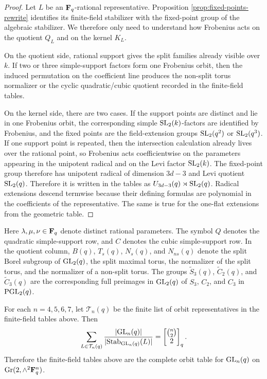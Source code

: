 \begin{proof}
Let \(L\) be an \(\mathbf F_q\)-rational representative. Proposition
\ref{prop:fixed-points-rewrite} identifies its finite-field stabilizer with the
fixed-point group of the algebraic stabilizer. We therefore only need to
understand how Frobenius acts on the quotient \(Q_L\) and on the kernel \(K_L\).

On the quotient side, rational support gives the split families already visible
over \(k\). If two or three simple-support factors form one Frobenius orbit,
then the induced permutation on the coefficient line produces the non-split
torus normalizer or the cyclic quadratic/cubic quotient recorded in the
finite-field tables.

On the kernel side, there are two cases. If the support points are distinct and
lie in one Frobenius orbit, the corresponding simple \(\mathrm{SL}_2(k)\)-factors are
identified by Frobenius, and the fixed points are the field-extension groups
\(\mathrm{SL}_2(q^2)\) or \(\mathrm{SL}_2(q^3)\). If one support point is repeated, then the
intersection calculation already lives over the rational point, so Frobenius
acts coefficientwise on the parameters appearing in the unipotent radical and
on the Levi factor \(\mathrm{SL}_2(k)\). The fixed-point group therefore has
unipotent radical of dimension \(3d-3\) and Levi quotient \(\mathrm{SL}_2(q)\).
Therefore it is written in the tables as
\(U_{3d-3}(q)\rtimes \mathrm{SL}_2(q)\). Radical extensions descend termwise because
their defining formulas are polynomial in the coefficients of the
representative. The same is true for the one-flat extensions from the
geometric table.
\end{proof}

\medskip

Here \(\lambda,\mu,\nu\in \mathbf F_q\) denote distinct rational parameters. The symbol
\(Q\) denotes the quadratic simple-support row, and \(C\) denotes the cubic
simple-support row. In the quotient column, \(B(q)\), \(T_s(q)\), \(N_s(q)\),
and \(N_{ns}(q)\) denote the split Borel subgroup of \(\mathrm{GL}_2(q)\), the split
maximal torus, the normalizer of the split torus, and the normalizer of a
non-split torus. The groups \(\widetilde{S}_3(q)\), \(\widetilde{C}_2(q)\),
and \(\widetilde{C}_3(q)\) are the corresponding full preimages in \(\mathrm{GL}_2(q)\)
of \(S_3\), \(C_2\), and \(C_3\) in \(\mathrm{PGL}_2(q)\).

\begingroup
\footnotesize
\setlength{\tabcolsep}{4pt}

\endgroup

\begin{theorem}
\label{thm:orbit-stabilizer-completeness}
For each \(n=4,5,6,7\), let \(\mathcal T_n(q)\) be the finite list of orbit
representatives in the finite-field tables above. Then
\[
  \sum_{L\in \mathcal T_n(q)}
  \frac{|\mathrm{GL}_n(q)|}{|\mathrm{Stab}_{\mathrm{GL}_n(q)}(L)|}
  =
  \left[\begin{matrix}\binom{n}{2}\\2\end{matrix}\right]_q.
\]
Therefore the finite-field tables above are the complete orbit table for
\(\mathrm{GL}_n(q)\) on \(\mathrm{Gr}(2,\wedge^2 \mathbf F_q^n)\).
\end{theorem}

